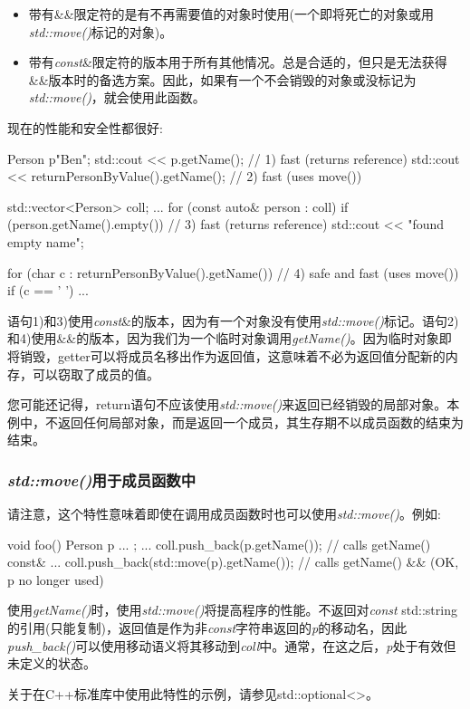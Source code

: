 \begin{itemize}
	\item 带有\&\&限定符的是有不再需要值的对象时使用(一个即将死亡的对象或用\textit{std::move()}标记的对象)。
	\item 带有\textit{const}\&限定符的版本用于所有其他情况。总是合适的，但只是无法获得\&\&版本时的备选方案。因此，如果有一个不会销毁的对象或没标记为\textit{std::move()}，就会使用此函数。
\end{itemize}

现在的性能和安全性都很好:

\begin{cppcode}
Person p{"Ben"};
std::cout << p.getName(); // 1) fast (returns reference)
std::cout << returnPersonByValue().getName(); // 2) fast (uses move())

std::vector<Person> coll;
...
for (const auto& person : coll) {
	if (person.getName().empty()) { // 3) fast (returns reference)
		std::cout << "found empty name\n";
	}
}

for (char c : returnPersonByValue().getName()) { // 4) safe and fast (uses move())
	if (c == ' ') {
		...
	}
}
\end{cppcode}

语句1)和3)使用\textit{const}\&的版本，因为有一个对象没有使用\textit{std::move()}标记。语句2)和4)使用\&\&的版本，因为我们为一个临时对象调用\textit{getName()}。因为临时对象即将销毁，getter可以将成员名移出作为返回值，这意味着不必为返回值分配新的内存，可以窃取了成员的值。

您可能还记得，return语句不应该使用\textit{std::move()}来返回已经销毁的局部对象。本例中，不返回任何局部对象，而是返回一个成员，其生存期不以成员函数的结束为结束。

\subsubsection{\textit{std::move()}用于成员函数中}

请注意，这个特性意味着即使在调用成员函数时也可以使用\textit{std::move()}。例如:

\begin{cppcode}
void foo()
{
	Person p{ ... };
	...
	coll.push_back(p.getName()); // calls getName() const&
	...
	coll.push_back(std::move(p).getName()); // calls getName() && (OK, p no longer used)
}
\end{cppcode}

使用\textit{getName()}时，使用\textit{std::move()}将提高程序的性能。不返回对\textit{const} std::string的引用(只能复制)，返回值是作为非\textit{const}字符串返回的\textit{p}的移动名，因此\textit{push_back()}可以使用移动语义将其移动到\textit{coll}中。通常，在这之后，\textit{p}处于有效但未定义的状态。

关于在C++标准库中使用此特性的示例，请参见std::optional<>。
















